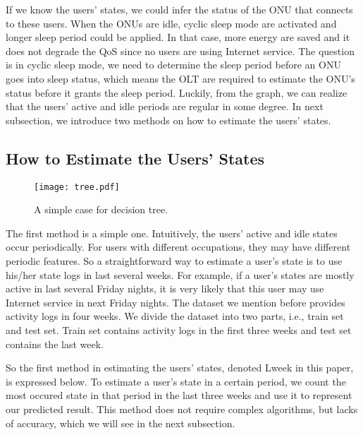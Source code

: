 \documentclass[journal]{IEEEtran}
\begin{document}
If we know the users' states, we could infer the status of the ONU that connects to these users. When the ONUs are idle, cyclic sleep mode are activated and longer sleep period could be applied. In that case, more energy are saved and it does not degrade the QoS since no users are using Internet service. The question is in cyclic sleep mode, we need to determine the sleep period before an ONU goes into sleep status, which means the OLT are required to estimate the ONU's status before it grants the sleep period. Luckily, from the graph, we can realize that the users' active and idle periods are regular in some degree. In next subsection, we introduce two methods on how to estimate the users' states.

\subsection{How to Estimate the Users' States}

\begin{figure}[t]
  \centering 
  \texttt{[image: tree.pdf]}\\ 
  \caption{ A simple case for decision tree.}
  \label{tree}
\end{figure}

The first method is a simple one. Intuitively, the users' active and idle states occur periodically. For users with different occupations, they may have different periodic features. So a straightforward way to estimate a user's state is to use his/her state logs in last several weeks. For example, if a user's states are mostly active in last several Friday nights, it is very likely that this user may use Internet service in next Friday nights. The dataset we mention before provides activity logs in four weeks. We divide the dataset into two parts, i.e., train set and test set. Train set contains activity logs in the first three weeks and test set contains the last week.

So the first method in estimating the users' states, denoted Lweek in this paper, is expressed below. To estimate a user's state in a certain period, we count the most occured state in that period in the last three weeks and use it to represent our predicted result. This method does not require complex algorithms, but lacks of accuracy, which we will see in the next subsection.
\end{document}
